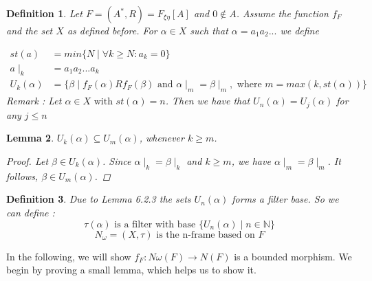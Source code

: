 \documentclass[12pt, a4paper]{scrartcl}
\newtheorem{definition}{Definition}[subsection]
\newtheorem{lemma}[definition]{Lemma}
\begin{document}
\begin{definition}
    Let $F = (A^*, R) = F_{\xi \eta}[A]$ and $0 \notin A$. Assume the function $f_F$ and the set $X$ as defined before.
    For $\alpha \in X$ such that $\alpha = a_1a_2...$ we define 
    
    \begin{align*}
            st(a) &= min\{N \mid \forall k \geq N : a_k = 0\} \\
            a \mid_{k} &= a_1a_2...a_k \\
            U_k(\alpha) &= \{ \beta \mid f_F(\alpha)Rf_F(\beta) \mbox{ and } \alpha \mid_m = \beta \mid_m,  \mbox{ where } m = max(k, st(\alpha))\} 
    \end{align*} 
    Remark : Let $\alpha \in X \mbox{ with } st(\alpha) = n$. Then we have that $U_n(\alpha) = U_j(\alpha)$ for any $j \leq n$

\end{definition}

\begin{lemma}
    $U_k(\alpha) \subseteq U_m(\alpha)$, whenever $k \geq m$.
    
    \begin{proof}
        Let $\beta \in U_k(\alpha)$. Since $\alpha \mid_k = \beta \mid_k$ and $k \geq m$, we have $\alpha \mid_m = \beta \mid_m$. It follows, $\beta \in U_m(\alpha)$.
    \end{proof}
\end{lemma}

\begin{definition}
    Due to Lemma 6.2.3 the sets $U_n(\alpha)$ forms a filter base. So we can define :
    $$\tau(\alpha) \mbox{ is a filter with base } \{U_n(\alpha) \mid n \in \mathbb{N} \}$$
    $$N_\omega = (X, \tau) \mbox{ is the n-frame based on } F$$

\end{definition}

In the following, we will show $f_F : N\omega(F) \rightarrow N(F)$ is a bounded morphism. We begin by proving a small lemma, which helps us to show it.
\end{document}
